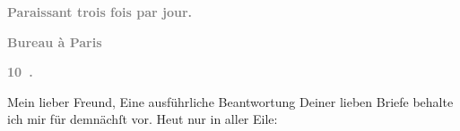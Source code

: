 \pstart
           \begin{otherlanguage}{french}\textcolor{gray}{\textbf{\textbf{Paraissant trois fois par jour.}}}\end{otherlanguage}\pend
           
\pstart
           \begin{otherlanguage}{french}\textcolor{gray}{\textbf{\textbf{Bureau à Paris}}}\end{otherlanguage}\pend
           
\pstart
           \begin{otherlanguage}{french}\textcolor{gray}{\textbf{\textbf{10 .}}}\end{otherlanguage}\pend
           
\pstart\center{}Mein lieber Freund,\pend\vspace{0.5em}
\pstart
           Eine ausführliche Beantwortung Deiner lieben Briefe behalte ich mir für demnächſt
               vor. Heut nur in aller Eile:\pend
           
